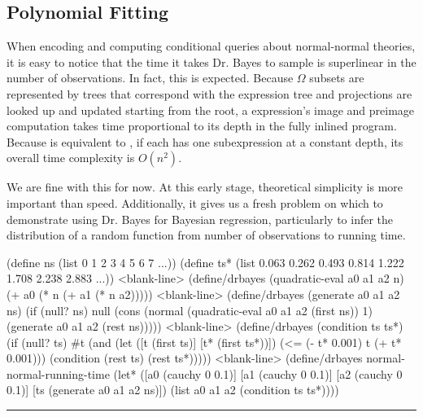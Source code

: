 \subsection{Polynomial Fitting}

When encoding and computing conditional queries about normal-normal theories, it is easy to notice that the time it takes Dr. Bayes to sample is superlinear in the number of observations.
In fact, this is expected.
Because $\Omega$ subsets are represented by trees that correspond with the expression tree and projections are looked up and updated starting from the root, a  expression's image and preimage computation takes time proportional to its depth in the fully inlined program.
Because  is equivalent to , if each  has one  subexpression at a constant depth, its overall time complexity is $O(n^2)$.

We are fine with this for now.
At this early stage, theoretical simplicity is more important than speed.
Additionally, it gives us a fresh problem on which to demonstrate using Dr. Bayes for Bayesian regression, particularly to infer the distribution of a random function from number of observations to running time.

\begin{lrbox}{\codebox}
\begin{varwidth}{\textwidth}
\begin{center}\singlespacing
\begin{schemedisplay}
(define ns  (list     0     1     2     3     4     5     6     7 ...))
(define ts* (list 0.063 0.262 0.493 0.814 1.222 1.708 2.238 2.883 ...))
<blank-line>
(define/drbayes (quadratic-eval a0 a1 a2 n)
  (+ a0 (* n (+ a1 (* n a2)))))
<blank-line>
(define/drbayes (generate a0 a1 a2 ns)
  (if (null? ns) null (cons (normal (quadratic-eval a0 a1 a2 (first ns)) 1)
                            (generate a0 a1 a2 (rest ns)))))
<blank-line>
(define/drbayes (condition ts ts*)
  (if (null? ts) #t (and (let ([t   (first ts)]
                               [t*  (first ts*))])
                           (<= (- t* 0.001) t (+ t* 0.001)))
                         (condition (rest ts) (rest ts*)))))
<blank-line>  
(define/drbayes normal-normal-running-time
  (let* ([a0  (cauchy 0 0.1)]
         [a1  (cauchy 0 0.1)]
         [a2  (cauchy 0 0.1)]
         [ts  (generate a0 a1 a2 ns)])
    (list a0 a1 a2 (condition ts ts*))))
\end{schemedisplay}
\end{center}
\vspace{-0.75\baselineskip}
\hrule
\end{varwidth}
\end{lrbox}

